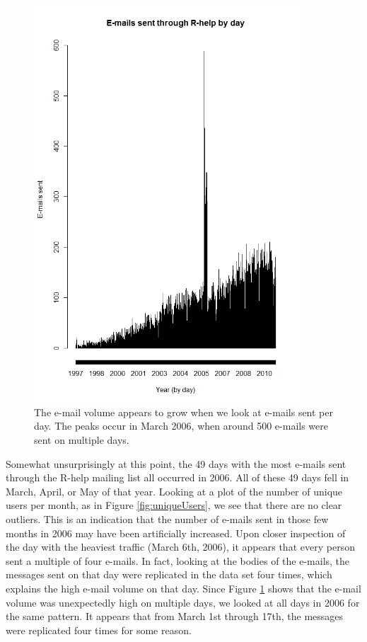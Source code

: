 \documentclass[12pt, a4paper, oneside]{amsart}
\begin{document}
\begin{figure}[htp]
\centering
\includegraphics[width = 100mm]{rhelpByDay.png}
\caption{The e-mail volume appears to grow when we look at e-mails sent per day.  The peaks occur in March 2006, when around 500 e-mails were sent on multiple days.}\label{fig:rhelpByDay}
\end{figure}

Somewhat unsurprisingly at this point, the 49 days with the most e-mails sent through the R-help mailing list all occurred in 2006.  All of these 49 days fell in March, April, or May of that year.  Looking at a plot of the number of unique users per month, as in Figure \ref{fig:uniqueUsers}, we see that there are no clear outliers.  This is an indication that the number of e-mails sent in those few months in 2006 may have been artificially increased.  Upon closer inspection of the day with the heaviest traffic (March 6th, 2006), it appears that every person sent a multiple of four e-mails.  In fact, looking at the bodies of the e-mails, the messages sent on that day were replicated in the data set four times, which explains the high e-mail volume on that day.  Since Figure \ref{fig:rhelpByDay} shows that the e-mail volume was unexpectedly high on multiple days, we looked at all days in 2006 for the same pattern.  It appears that from March 1st through 17th, the messages were replicated four times for some reason.
\end{document}
